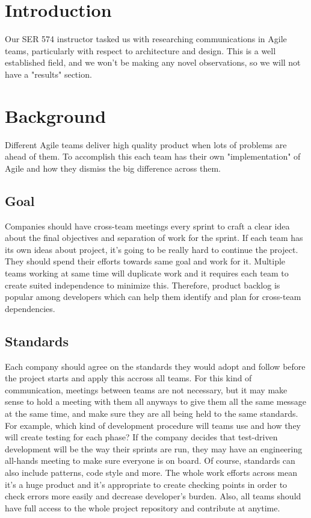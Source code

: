 \documentclass[sigplan,screen]{acmart}
\begin{document}
%
\maketitle

\section{Introduction}
Our SER 574 instructor tasked us with researching communications in Agile teams, particularly with respect to architecture and design. This is a well established field, and we won't be making any novel observations, so we will not have a "results" section.

\section{Background}
Different Agile teams deliver high quality product when lots of problems are ahead of them. To accomplish this each team has their own "implementation" of Agile and how they dismiss the big difference across them. 

\subsection{Goal}
Companies should have cross-team meetings every sprint to craft a clear idea about the final objectives and separation of work for the sprint. If each team has its own ideas about project, it's going to be really hard to continue the project. They should spend their efforts towards same goal and work for it. Multiple teams working at same time will duplicate work and it requires each team to create suited independence to minimize this. Therefore, product backlog is popular among developers which can help them identify and plan for cross-team dependencies.

\subsection{Standards} 
Each company should agree on the standards they would adopt and follow before the project starts and apply this accross all teams. For this kind of communication, meetings between teams are not necessary, but it may make sense to hold a meeting with them all anyways to give them all the same message at the same time, and make sure they are all being held to the same standards. For example, which kind of development procedure will teams use and how they will create testing for each phase? If the company decides that test-driven development will be the way their sprints are run, they may have an engineering all-hands meeting to make sure everyone is on board. Of course, standards can also include patterns, code style and more. The whole work efforts across mean it's a huge product and it's appropriate to create checking points in order to check errors more easily and decrease developer's burden. Also, all teams should have full access to the whole project repository and contribute at anytime.
\end{document}
